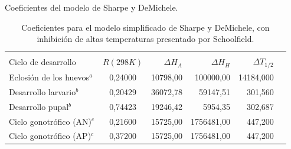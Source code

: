 \begin{frame}[t]{Coeficientes del modelo de Sharpe y DeMichele.}
\begin{table}
\begin{minipage}{\textwidth}
    \centering
    \small
    \caption{ \label{tab:coef-sharpe-demichele} Coeficientes para el modelo simplificado de Sharpe y DeMichele, con inhibición de altas temperaturas presentado por Schoolfield.}
    \begin{tabular}{l c r r r r }
        \hline \\
        Ciclo de desarrollo    & $R(298K)$ & $\Delta H_{A}$ & $\Delta H_{H}$ & $\Delta T_{1/2}$  \\
        \hline
        \hline
        Eclosión de los huevos$^a$ & 0,24000 & 10798,00 &  100000,00  & 14184,000\\
        Desarrollo larvario$^b$    & 0,20429 & 36072,78 &   59147,51  &   301,560\\
        Desarrollo pupal$^b$       & 0,74423 & 19246,42 &    5954,35  &   302,687\\
        Ciclo gonotrófico (AN)$^c$ & 0,21600 & 15725,00 & 1756481,00  &   447,200\\
        Ciclo gonotrófico (AP)$^c$ & 0,37200 & 15725,00 & 1756481,00  &   447,200\\
    \end{tabular}
\end{minipage}
\end{table}
\end{frame}
